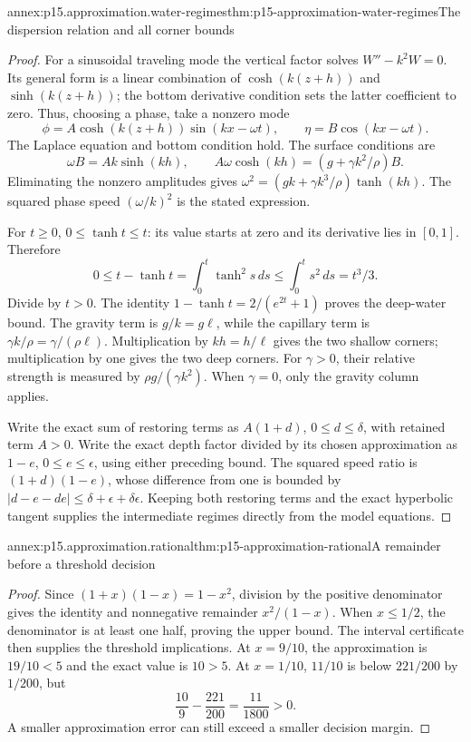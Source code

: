 \begin{annexitem}{annex:p15.approximation.water-regimes}{thm:p15-approximation-water-regimes}{The dispersion relation and all corner bounds}
\begin{proof}
For a sinusoidal traveling mode the vertical factor solves
\(W''-k^2W=0\). Its general form is a linear combination of
\(\cosh(k(z+h))\) and \(\sinh(k(z+h))\); the bottom derivative
condition sets the latter coefficient to zero. Thus, choosing a phase,
take a nonzero mode
\[
 \phi=A\cosh(k(z+h))\sin(kx-\omega t),\qquad
 \eta=B\cos(kx-\omega t).
\]
The Laplace equation and bottom condition hold. The surface conditions are
\[
 \omega B=Ak\sinh(kh),\qquad
 A\omega\cosh(kh)=(g+\gamma k^2/\rho)B.
\]
Eliminating the nonzero amplitudes gives
\(\omega^2=(gk+\gamma k^3/\rho)\tanh(kh)\).
The squared phase speed \((\omega/k)^2\) is the stated expression.

For \(t\geq0\), \(0\leq\tanh t\leq t\): its value starts at zero
and its derivative lies in \([0,1]\). Therefore
\[
 0\leq t-\tanh t=\int_0^t\tanh^2s\,ds
                \leq\int_0^ts^2\,ds=t^3/3.
\]
Divide by \(t>0\). The identity
\(1-\tanh t=2/(e^{2t}+1)\) proves the deep-water bound.
The gravity term is \(g/k=g\ell\), while the capillary term is
\(\gamma k/\rho=\gamma/(\rho\ell)\). Multiplication by
\(kh=h/\ell\) gives the two shallow corners; multiplication by one
gives the two deep corners. For \(\gamma>0\), their relative strength
is measured by \(\rho g/(\gamma k^2)\). When \(\gamma=0\), only the
gravity column applies.

Write the exact sum of restoring terms as \(A(1+d)\),
\(0\leq d\leq\delta\), with retained term \(A>0\). Write the exact
depth factor divided by its chosen approximation as \(1-e\),
\(0\leq e\leq\epsilon\), using either preceding bound. The squared
speed ratio is \((1+d)(1-e)\), whose difference from one is bounded by
\(|d-e-de|\leq\delta+\epsilon+\delta\epsilon\).
Keeping both restoring terms and the exact hyperbolic tangent supplies
the intermediate regimes directly from the model equations.
\end{proof}
\end{annexitem}

\begin{annexitem}{annex:p15.approximation.rational}{thm:p15-approximation-rational}{A remainder before a threshold decision}
\begin{proof}
Since \((1+x)(1-x)=1-x^2\), division by the positive denominator gives
the identity and nonnegative remainder \(x^2/(1-x)\). When \(x\leq1/2\),
the denominator is at least one half, proving the upper bound.
The interval certificate then supplies the threshold implications.
At \(x=9/10\), the approximation is \(19/10<5\) and the exact value
is \(10>5\). At \(x=1/10\), \(11/10\) is below \(221/200\) by
\(1/200\), but
\[
 \frac{10}{9}-\frac{221}{200}=\frac{11}{1800}>0.
\]
A smaller approximation error can still exceed a smaller decision margin.
\end{proof}
\end{annexitem}

